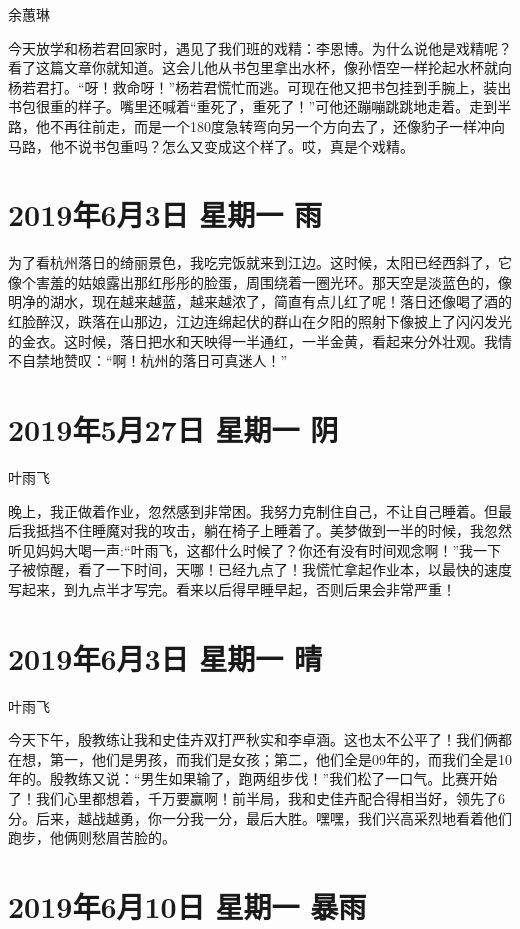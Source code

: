 余蕙琳

今天放学和杨若君回家时，遇见了我们班的戏精：李恩博。为什么说他是戏精呢？看了这篇文章你就知道。这会儿他从书包里拿出水杯，像孙悟空一样抡起水杯就向杨若君打。``呀！救命呀！''杨若君慌忙而逃。可现在他又把书包挂到手腕上，装出书包很重的样子。嘴里还喊着``重死了，重死了！''可他还蹦嘣跳跳地走着。走到半路，他不再往前走，而是一个180度急转弯向另一个方向去了，还像豹子一样冲向马路，他不说书包重吗？怎么又变成这个样了。哎，真是个戏精。

\section{2019年6月3日 星期一 雨}

为了看杭州落日的绮丽景色，我吃完饭就来到江边。这时候，太阳已经西斜了，它像个害羞的姑娘露出那红彤彤的脸蛋，周围绕着一圈光环。那天空是淡蓝色的，像明净的湖水，现在越来越蓝，越来越浓了，简直有点儿红了呢！落日还像喝了酒的红脸醉汉，跌落在山那边，江边连绵起伏的群山在夕阳的照射下像披上了闪闪发光的金衣。这时候，落日把水和天映得一半通红，一半金黄，看起来分外壮观。我情不自禁地赞叹：``啊！杭州的落日可真迷人！''

\section{2019年5月27日 星期一 阴}

叶雨飞

晚上，我正做着作业，忽然感到非常困。我努力克制住自己，不让自己睡着。但最后我抵挡不住睡魔对我的攻击，躺在椅子上睡着了。美梦做到一半的时候，我忽然听见妈妈大喝一声:``叶雨飞，这都什么时候了？你还有没有时间观念啊！''我一下子被惊醒，看了一下时间，天哪！已经九点了！我慌忙拿起作业本，以最快的速度写起来，到九点半才写完。看来以后得早睡早起，否则后果会非常严重！

\section{2019年6月3日 星期一 晴}

叶雨飞

今天下午，殷教练让我和史佳卉双打严秋实和李卓涵。这也太不公平了！我们俩都在想，第一，他们是男孩，而我们是女孩；第二，他们全是09年的，而我们全是10年的。殷教练又说：``男生如果输了，跑两组步伐！''我们松了一口气。比赛开始了！我们心里都想着，千万要赢啊！前半局，我和史佳卉配合得相当好，领先了6分。后来，越战越勇，你一分我一分，最后大胜。嘿嘿，我们兴高采烈地看着他们跑步，他俩则愁眉苦脸的。

\section{2019年6月10日 星期一 暴雨}

